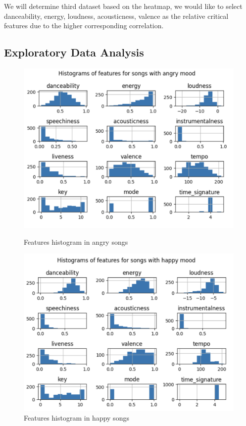 \documentclass{article}
\begin{document}
We will determine third dataset based on the heatmap, we would like to select danceability, energy, loudness, acousticness, valence as the relative critical features due to the higher corresponding correlation.
\newpage
\subsection{Exploratory Data Analysis}
\begin{figure}[!htb]
   \begin{minipage}{0.48\textwidth}
     \centering
     \includegraphics[scale=0.4]{angry .png}
     \caption{Features histogram in angry songs}\label{Fig:Data1}
   \end{minipage}\hfill
   \begin{minipage}{0.48\textwidth}
     \centering
     \includegraphics[scale=0.4]{happy.png}
     \caption{Features histogram in happy songs}\label{Fig:Data2}
   \end{minipage}
\end{figure}
\end{document}

